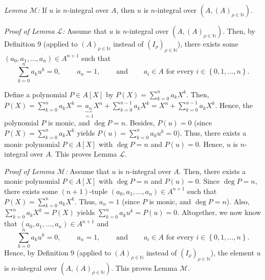\documentclass[12pt,final,notitlepage,onecolumn]{article}%
\begin{document}
\textit{Lemma} $\mathcal{M}$\textit{:} If $u$ is $n$-integral over $A$, then
$u$ is $n$-integral over $\left(  A,\left(  A\right)  _{\rho\in\mathbb{N}%
}\right)  $.

\textit{Proof of Lemma }$\mathcal{L}$\textit{:} Assume that $u$ is
$n$-integral over $\left(  A,\left(  A\right)  _{\rho\in\mathbb{N}}\right)  $.
Then, by Definition 9 (applied to $\left(  A\right)  _{\rho\in\mathbb{N}}$
instead of $\left(  I_{\rho}\right)  _{\rho\in\mathbb{N}}$), there exists some
$\left(  a_{0},a_{1},...,a_{n}\right)  \in A^{n+1}$ such that%
\[
\sum\limits_{k=0}^{n}a_{k}u^{k}=0,\ \ \ \ \ \ \ \ \ \ a_{n}%
=1,\ \ \ \ \ \ \ \ \ \ \text{and}\ \ \ \ \ \ \ \ \ \ a_{i}\in A\text{ for
every }i\in\left\{  0,1,...,n\right\}  .
\]


Define a polynomial $P\in A\left[  X\right]  $ by $P\left(  X\right)
=\sum\limits_{k=0}^{n}a_{k}X^{k}$. Then, $P\left(  X\right)  =\sum
\limits_{k=0}^{n}a_{k}X^{k}=\underbrace{a_{n}}_{=1}X^{n}+\sum\limits_{k=0}%
^{n-1}a_{k}X^{k}=X^{n}+\sum\limits_{k=0}^{n-1}a_{k}X^{k}$. Hence, the
polynomial $P$ is monic, and $\deg P=n$. Besides, $P\left(  u\right)  =0$
(since $P\left(  X\right)  =\sum\limits_{k=0}^{n}a_{k}X^{k}$ yields $P\left(
u\right)  =\sum\limits_{k=0}^{n}a_{k}u^{k}=0$). Thus, there exists a monic
polynomial $P\in A\left[  X\right]  $ with $\deg P=n$ and $P\left(  u\right)
=0$. Hence, $u$ is $n$-integral over $A$. This proves Lemma $\mathcal{L}$.

\textit{Proof of Lemma }$\mathcal{M}$\textit{:} Assume that $u$ is
$n$-integral over $A$. Then, there exists a monic polynomial $P\in A\left[
X\right]  $ with $\deg P=n$ and $P\left(  u\right)  =0$. Since $\deg P=n$,
there exists some $\left(  n+1\right)  $-tuple $\left(  a_{0},a_{1}%
,...,a_{n}\right)  \in A^{n+1}$ such that $P\left(  X\right)  =\sum
\limits_{k=0}^{n}a_{k}X^{k}$. Thus, $a_{n}=1$ (since $P$ is monic, and $\deg
P=n$). Also, $\sum\limits_{k=0}^{n}a_{k}X^{k}=P\left(  X\right)  $ yields
$\sum\limits_{k=0}^{n}a_{k}u^{k}=P\left(  u\right)  =0$. Altogether, we now
know that $\left(  a_{0},a_{1},...,a_{n}\right)  \in A^{n+1}$ and%
\[
\sum\limits_{k=0}^{n}a_{k}u^{k}=0,\ \ \ \ \ \ \ \ \ \ a_{n}%
=1,\ \ \ \ \ \ \ \ \ \ \text{and}\ \ \ \ \ \ \ \ \ \ a_{i}\in A\text{ for
every }i\in\left\{  0,1,...,n\right\}  .
\]
Hence, by Definition 9 (applied to $\left(  A\right)  _{\rho\in\mathbb{N}}$
instead of $\left(  I_{\rho}\right)  _{\rho\in\mathbb{N}}$), the element $u$
is $n$-integral over $\left(  A,\left(  A\right)  _{\rho\in\mathbb{N}}\right)
$. This proves Lemma $\mathcal{M}$.
\end{document}
